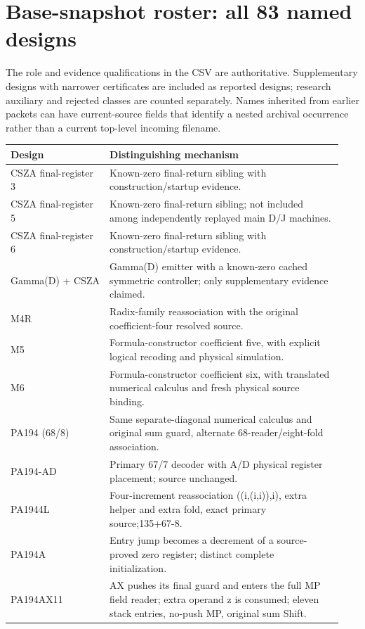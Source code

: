 \documentclass[10pt,a4paper]{article}
\begin{document}
\clearpage\section{Base-snapshot roster: all 83 named designs}
The role and evidence qualifications in the CSV are authoritative. Supplementary designs with narrower certificates are included as reported designs; research auxiliary and rejected classes are counted separately. Names inherited from earlier packets can have current-source fields that identify a nested archival occurrence rather than a current top-level incoming filename.
\small\begin{longtable}{p{0.28\linewidth}p{0.66\linewidth}}\toprule Design & Distinguishing mechanism \\\midrule\endhead
CSZA final-register 3 & Known-zero final-return sibling with construction/startup evidence. \\
CSZA final-register 5 & Known-zero final-return sibling; not included among independently replayed main D/J machines. \\
CSZA final-register 6 & Known-zero final-return sibling with construction/startup evidence. \\
Gamma(D) + CSZA & Gamma(D) emitter with a known-zero cached symmetric controller; only supplementary evidence claimed. \\
M4R & Radix-family reassociation with the original coefficient-four resolved source. \\
M5 & Formula-constructor coefficient five, with explicit logical recoding and physical simulation. \\
M6 & Formula-constructor coefficient six, with translated numerical calculus and fresh physical source binding. \\
PA194\allowbreak{} (68/8) & Same separate-diagonal numerical calculus and original sum guard, alternate 68-reader/eight-fold association. \\
PA194\allowbreak{}-AD & Primary 67/7 decoder with A/D physical register placement; source unchanged. \\
PA194\allowbreak{}4L & Four-increment reassociation ((i,\allowbreak{}(i,\allowbreak{}i)),\allowbreak{}i), extra helper and extra fold, exact primary source;135+67-8. \\
PA194\allowbreak{}A & Entry jump becomes a decrement of a source-proved zero register; distinct complete initialization. \\
PA194\allowbreak{}AX11\allowbreak{} & AX pushes its final guard and enters the full MP field reader; extra operand z is consumed; eleven stack entries, no-push MP, original sum Shift. \\

\end{longtable}
\end{document}
